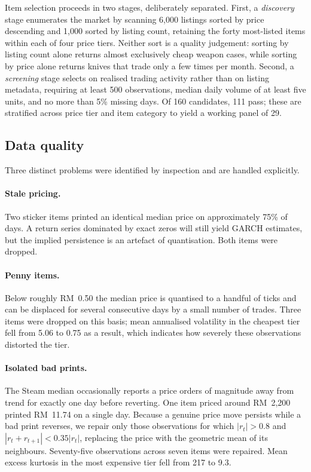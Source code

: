 \documentclass[11pt,a4paper]{article}
\begin{document}
Item selection proceeds in two stages, deliberately separated. First, a
\emph{discovery} stage enumerates the market by scanning 6{,}000 listings
sorted by price descending and 1{,}000 sorted by listing count, retaining the
forty most-listed items within each of four price tiers. Neither sort is a
quality judgement: sorting by listing count alone returns almost exclusively
cheap weapon cases, while sorting by price alone returns knives that trade only
a few times per month. Second, a \emph{screening} stage selects on realised
trading activity rather than on listing metadata, requiring at least 500
observations, median daily volume of at least five units, and no more than 5\%
missing days. Of 160 candidates, 111 pass; these are stratified across price
tier and item category to yield a working panel of 29.

\subsection{Data quality}

Three distinct problems were identified by inspection and are handled
explicitly.

\paragraph{Stale pricing.} Two sticker items printed an identical median price
on approximately 75\% of days. A return series dominated by exact zeros will
still yield GARCH estimates, but the implied persistence is an artefact of
quantisation. Both items were dropped.

\paragraph{Penny items.} Below roughly RM~0.50 the median price is quantised to
a handful of ticks and can be displaced for several consecutive days by a small
number of trades. Three items were dropped on this basis; mean annualised
volatility in the cheapest tier fell from 5.06 to 0.75 as a result, which
indicates how severely these observations distorted the tier.

\paragraph{Isolated bad prints.} The Steam median occasionally reports a price
orders of magnitude away from trend for exactly one day before reverting. One
item priced around RM~2{,}200 printed RM~11.74 on a single day. Because a
genuine price move persists while a bad print reverses, we repair only those
observations for which $|r_t| > 0.8$ and $|r_t + r_{t+1}| < 0.35|r_t|$,
replacing the price with the geometric mean of its neighbours. Seventy-five
observations across seven items were repaired. Mean excess kurtosis in the
most expensive tier fell from 217 to 9.3.
\end{document}
